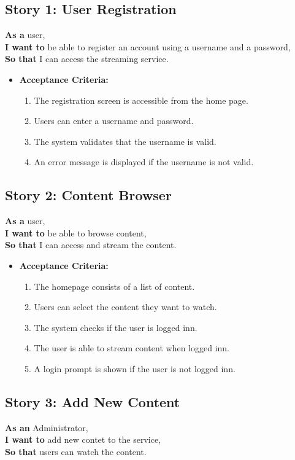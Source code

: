 \documentclass[12pt]{article}
\begin{document}
\subsection{Story 1: User Registration}
\textbf{As a} user, \\
\textbf{I want to} be able to register an account using a username and a password, \\
\textbf{So that} I can access the streaming service.

\begin{itemize}[label={}]
    \item \textbf{Acceptance Criteria:}
    \begin{enumerate}
        \item The registration screen is accessible from the home page.
        \item Users can enter a username and password.
        \item The system validates that the username is valid.
        \item An error message is displayed if the username is not valid.
    \end{enumerate}
\end{itemize}

\subsection{Story 2: Content Browser}
\textbf{As a} user, \\
\textbf{I want to} be able to browse content, \\
\textbf{So that} I can access and stream the content.

\begin{itemize}[label={}]
    \item \textbf{Acceptance Criteria:}
    \begin{enumerate}
        \item The homepage consists of a list of content.
        \item Users can select the content they want to watch.
        \item The system checks if the user is logged inn.
        \item The user is able to stream content when logged inn.
        \item A login prompt is shown if the user is not logged inn.
    \end{enumerate}
\end{itemize}

\subsection{Story 3: Add New Content}
\textbf{As an} Administrator, \\
\textbf{I want to} add new contet to the service, \\
\textbf{So that} users can watch the content.
\end{document}

